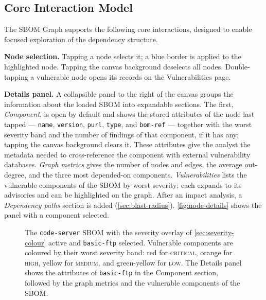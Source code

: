 \subsection{Core Interaction Model}
\label{sec:interaction-model}

The SBOM Graph supports the following core interactions, designed to enable focused exploration of the dependency structure.

\textbf{Node selection.} Tapping a node selects it; a blue border is applied to the highlighted node. Tapping the canvas background deselects all nodes. Double-tapping a vulnerable node opens its records on the Vulnerabilities page.

\textbf{Details panel.} A collapsible panel to the right of the canvas groups the information about the loaded SBOM into expandable sections. The first, \emph{Component}, is open by default and shows the stored attributes of the node last tapped --- \texttt{name}, \texttt{version}, \texttt{purl}, \texttt{type}, and \texttt{bom-ref} --- together with the worst severity band and the number of findings of that component, if it has any; tapping the canvas background clears it. These attributes give the analyst the metadata needed to cross-reference the component with external vulnerability databases. \emph{Graph metrics} gives the number of nodes and edges, the average out-degree, and the three most depended-on components. \emph{Vulnerabilities} lists the vulnerable components of the SBOM by worst severity; each expands to its advisories and can be highlighted on the graph. After an impact analysis, a \emph{Dependency paths} section is added (\autoref{sec:blast-radius}). \autoref{fig:node-details} shows the panel with a component selected.

\begin{figure}[!htpb]
    \centering
    \caption[The Details panel and the severity overlay]{The \texttt{code-server} SBOM with the severity overlay of \autoref{sec:severity-colour} active and \texttt{basic-ftp} selected. Vulnerable components are coloured by their worst severity band: red for \textsc{critical}, orange for \textsc{high}, yellow for \textsc{medium}, and green-yellow for \textsc{low}. The Details panel shows the attributes of \texttt{basic-ftp} in the Component section, followed by the graph metrics and the vulnerable components of the SBOM.}
    \label{fig:node-details}
\end{figure}

